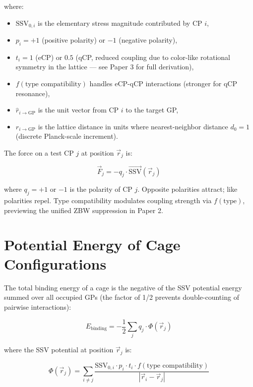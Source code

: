 \documentclass[11pt]{article}
\begin{document}
where:
\begin{itemize}
    \item $\text{SSV}_{0,i}$ is the elementary stress magnitude contributed by CP $i$,
    \item $p_i = +1$ (positive polarity) or $-1$ (negative polarity),
    \item $t_i = 1$ (eCP) or $0.5$ (qCP, reduced coupling due to color-like rotational symmetry in the lattice — see Paper 3 for full derivation),
    \item $f(\text{type compatibility})$ handles eCP-qCP interactions (stronger for qCP resonance),
    \item $\hat{r}_{i \to \text{GP}}$ is the unit vector from CP $i$ to the target GP,
    \item $r_{i \to \text{GP}}$ is the lattice distance in units where nearest-neighbor distance $d_0 = 1$ (discrete Planck-scale increment).
\end{itemize}

The force on a test CP $j$ at position $\vec{r}_j$ is:

\begin{equation}
\vec{F}_j = -q_j \cdot \vec{\text{SSV}}(\vec{r}_j)
\label{eq:force_law}
\end{equation}

where $q_j = +1$ or $-1$ is the polarity of CP $j$. Opposite polarities attract; like polarities repel. Type compatibility modulates coupling strength via $f(\text{type})$, previewing the unified ZBW suppression in Paper 2.

\section{Potential Energy of Cage Configurations}

The total binding energy of a cage is the negative of the SSV potential energy summed over all occupied GPs (the factor of 1/2 prevents double-counting of pairwise interactions):

\begin{equation}
E_{\text{binding}} = -\frac{1}{2} \sum_{j} q_j \cdot \Phi(\vec{r}_j)
\label{eq:binding_energy}
\end{equation}

where the SSV potential at position $\vec{r}_j$ is:

\begin{equation}
\Phi(\vec{r}_j) = \sum_{i \neq j} \frac{\text{SSV}_{0,i} \cdot p_i \cdot t_i \cdot f(\text{type compatibility})}{|\vec{r}_i - \vec{r}_j|}
\label{eq:ssv_potential}
\end{equation}
\end{document}
